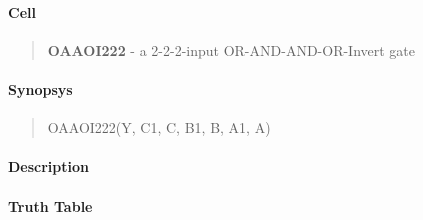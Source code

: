 \label{OAAOI222}
\paragraph{Cell}
\begin{quote}
    \textbf{OAAOI222} - a 2-2-2-input OR-AND-AND-OR-Invert gate
\end{quote}

\paragraph{Synopsys}
\begin{quote}
    OAAOI222(Y, C1, C, B1, B, A1, A)
\end{quote}

\paragraph{Description}

%

\paragraph{Truth Table}
%

